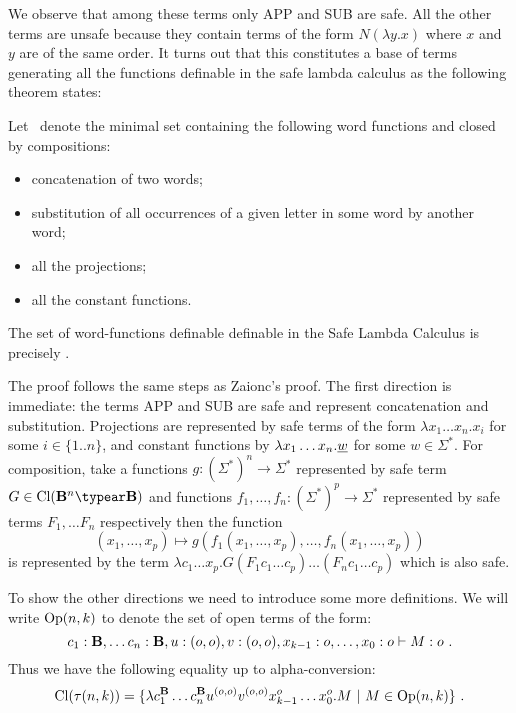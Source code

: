 We observe that among these terms only {\rm APP} and {\rm SUB} are
safe. All the other terms are unsafe because they contain terms of
the form $ N (\lambda y .x)$ where $x$ and $y$ are of the same
order. It turns out that this constitutes a base of terms generating
all the functions definable in the safe lambda calculus as the
following theorem states:
\begin{theorem}
\label{thm:wordfunctions_safely_definable}
Let \safedefset\ denote the minimal set containing the following word functions and closed by compositions:
\begin{itemize}
  \item concatenation of two words;
  \item substitution of all occurrences of a given letter in some word by another word;
  \item all the projections;
  \item all the constant functions.
\end{itemize}
The set of word-functions definable definable in the Safe Lambda Calculus is precisely
\safedefset.
\end{theorem}

The proof follows the same steps as Zaionc's proof.
The first direction is immediate: the terms {\rm APP} and {\rm SUB} are safe
and represent concatenation and substitution. Projections are represented by safe terms of the form $\lambda x_1 \ldots x_n . x_i$ for some $i\in\{1..n\}$, and constant
functions by $\lambda x_1 \ldots x_n . \underline{w}$ for some $w\in\Sigma^*$.
For composition, take a functions $g:(\Sigma^*)^n \rightarrow \Sigma^*$ represented by safe term $G\in \closedof{\zaiwordtyp^n \typear \zaiwordtyp}$ and functions $f_1,\ldots,f_n :
(\Sigma^*)^p \rightarrow \Sigma^*$ represented by
safe terms $F_1,\ldots F_n$ respectively then the function $$(x_1,\ldots,x_p) \mapsto g(f_1(x_1,\ldots,x_p),\ldots,f_n(x_1,\ldots,x_p))$$ is represented by the term
$\lambda c_1\ldots x_p. G (F_1 c_1 \ldots c_p)\ldots (F_n c_1 \ldots c_p)$ which is also safe.
\bigskip

To show the other directions we need to introduce some more definitions.
We will write ${\rm Op}(n,k)$ to denote the set of open terms
of the form:
$$c_1:\mathbf{B}, \ldots c_n :\mathbf{B}, u:(o,o), v:(o,o), x_{k-1}:o, \ldots, x_0 :o \vdash M : o \ .$$
Thus  we have the following equality up to alpha-conversion:
$$\closedof{\tau(n,k)} = \{ \lambda c_1^\zaiwordtyp \ldots c_n^\zaiwordtyp u^{(o,o)} v^{(o,o)} x_{k-1}^o \ldots x_0^o . M \ | \ M \in \openedof{n}{k}  \} \ .$$

